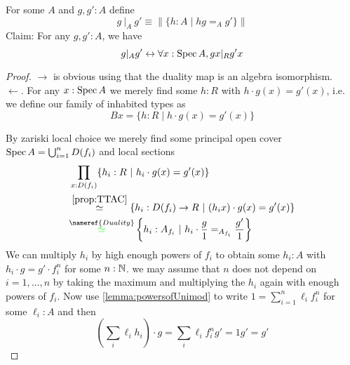 \documentclass{article}
\begin{document}
\begin{example}{\label{ex:Divisibility}}
	For some $A$ and $g,g' : A$ define
	\[
	g \ |_A \ g' \equiv \| \{ h : A \mid h g =_A g' \} \|
	\]
	Claim: For any $g,g' : A$, we have 
	\[
	g |_{A} g' \leftrightarrow \forall x : \operatorname{Spec} A , g x |_R g' x
	\]
\end{example}
\begin{proof}
	$\rightarrow$ is obvious using that the duality map is an algebra isomorphism.\\
	$\leftarrow$. For any $x : \operatorname{Spec} A$ we merely find some $h : R$ with $h \cdot g(x) = g'(x)$, i.e. we define our family of inhabited types as 
	\[
	B x =  \{h  : R \mid  h \cdot g(x) = g'(x) \}
	\]
	
	By zariski local choice we merely find some principal open cover $\operatorname{Spec} A = \bigcup_{i=1}^n D(f_i)$ and local sections
	\begin{align*}
		&\prod_{x : D(f_i)} \{h_i  : R \mid h_i \cdot g(x) = g'(x) \} \\
		&\overset{\ref{prop:TTAC}}{\simeq} \{h_i : D(f_i) \to R \mid (h_i x) \cdot g(x) = g'(x) \}\\
		&\overset{ \nameref{Duality}}{{\color{green} \simeq}} \left\{h_i : A_{f_i} \mid h_i \cdot \frac{g}{1} =_{A_{f_i}} \frac{g'}{1} \right \}   
	\end{align*}
	We can multiply $h_i$ by high enough powers of $f_i$ to obtain some $h_i : A$ with $h_i \cdot g = g' \cdot f_i^{n}$ for some $n : \mathbb{N}$. we may assume that $n$ does not depend on $i = 1 , \hdots, n$ by taking the maximum and multiplying the $h_i$ again with enough powers of $f_i$. Now use \ref{lemma:powersofUnimod} to write $ 1 = \sum_{i=1}^n \ell_i f_i^n$ for some $\ell_i : A$ and then \[
	(\sum_i \ell_i h_i) \cdot g = \sum_i \ell_i f_i^n g' = 1 g' = g'
	\]    
\end{proof}
\end{document}

